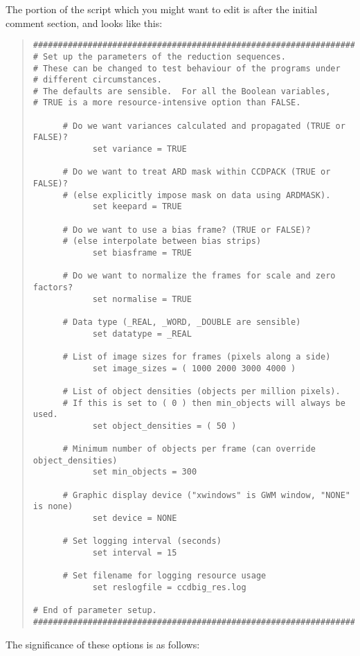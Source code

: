 The portion of the script which you might want to edit 
is after the initial comment section, and looks like this:
\begin{quote}
\begin{verbatim}
###################################################################
# Set up the parameters of the reduction sequences.
# These can be changed to test behaviour of the programs under
# different circumstances.
# The defaults are sensible.  For all the Boolean variables, 
# TRUE is a more resource-intensive option than FALSE.

      # Do we want variances calculated and propagated (TRUE or FALSE)?
            set variance = TRUE

      # Do we want to treat ARD mask within CCDPACK (TRUE or FALSE)?  
      # (else explicitly impose mask on data using ARDMASK).
            set keepard = TRUE

      # Do we want to use a bias frame? (TRUE or FALSE)?
      # (else interpolate between bias strips)
            set biasframe = TRUE

      # Do we want to normalize the frames for scale and zero factors?
            set normalise = TRUE

      # Data type (_REAL, _WORD, _DOUBLE are sensible)
            set datatype = _REAL

      # List of image sizes for frames (pixels along a side)
            set image_sizes = ( 1000 2000 3000 4000 )

      # List of object densities (objects per million pixels).
      # If this is set to ( 0 ) then min_objects will always be used.
            set object_densities = ( 50 )

      # Minimum number of objects per frame (can override object_densities)
            set min_objects = 300

      # Graphic display device ("xwindows" is GWM window, "NONE" is none)
            set device = NONE

      # Set logging interval (seconds)
            set interval = 15

      # Set filename for logging resource usage
            set reslogfile = ccdbig_res.log

# End of parameter setup.
###################################################################
\end{verbatim}
\end{quote}
The significance of these options is as follows:
